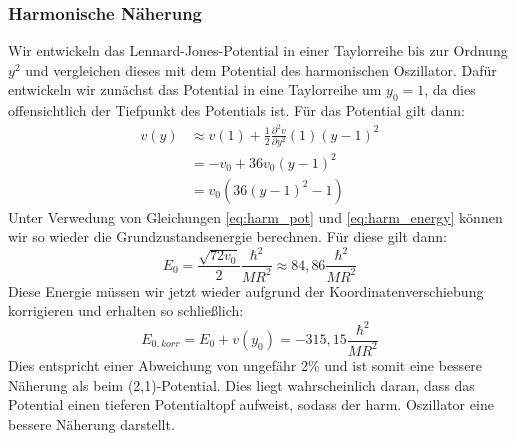 \documentclass[11pt,a4paper]{article}
\begin{document}
\subsubsection*{Harmonische Näherung}
Wir entwickeln das Lennard-Jones-Potential in einer Taylorreihe bis zur Ordnung $y^2$ und vergleichen dieses mit dem Potential des harmonischen Oszillator.
Dafür entwickeln wir zunächst das Potential in eine Taylorreihe um $y_0 = 1$, da dies offensichtlich der Tiefpunkt des Potentials ist. Für das Potential gilt dann:
\begin{align*}
	v(y) &\approx v(1) + \frac{1}{2}\frac{\partial^2 v}{\partial y^2}(1)(y-1)^2 \\
	&= -v_0 + 36v_0(y-1)^2 \\
	&= v_0\left(36(y-1)^2 -1\right)
\end{align*}
Unter Verwedung von Gleichungen \ref{eq:harm_pot} und \ref{eq:harm_energy} können wir so wieder die Grundzustandsenergie berechnen. Für diese gilt dann:
\begin{equation*}
	E_0 = \frac{\sqrt{72v_0}}{2}\frac{\hbar^2}{MR^2} \approx 84,86 \frac{\hbar^2}{MR^2}
\end{equation*}
Diese Energie müssen wir jetzt wieder aufgrund der Koordinatenverschiebung korrigieren und erhalten so schließlich:
\begin{equation}
	E_{0,korr} = E_0 + v(y_0) = -315,15 \frac{\hbar^2}{MR^2}
\end{equation}
Dies entspricht einer Abweichung von ungefähr 2\% und ist somit eine bessere Näherung als beim (2,1)-Potential. Dies liegt wahrscheinlich daran, dass das Potential einen tieferen Potentialtopf aufweist, sodass der harm. Oszillator eine bessere Näherung darstellt.
\newpage
\listoffigures
\listoftables
\end{document}
